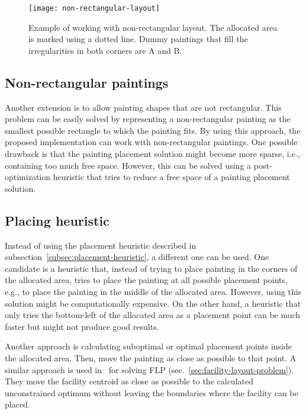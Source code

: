 \begin{figure}[h!]
    \texttt{[image: non-rectangular-layout]}
    \caption[Example of working with non-rectangular layout]{Example of working with non-rectangular layout. The allocated area is marked using a dotted line.
    Dummy paintings that fill the irregularities in both corners are A and B.}
    \label{fig:non-rectangular-layout}
\end{figure}

\subsection{Non-rectangular paintings}\label{subsec:non-rectangular-paintings}

Another extension is to allow painting shapes that are not rectangular.
This problem can be easily solved by representing a non-rectangular painting
as the smallest possible rectangle to which the painting fits.
By using this approach, the proposed implementation can work with non-rectangular paintings.
One possible drawback is that the painting placement solution might become more sparse,
i.e., containing too much free space.
However, this can be solved using a post-optimization heuristic that tries to reduce a free space
of a painting placement solution.

\subsection{Placing heuristic}\label{subsec:placing-heuristic}

Instead of using the placement heuristic described in subsection~\ref{subsec:placement-heuristic}, a different one can be used.
One candidate is a heuristic that, instead of trying to place painting in the corners of the allocated area,
tries to place the painting at all possible placement points, e.g., to place the painting in the middle of the allocated area.
However, using this solution might be computationally expensive.
On the other hand, a heuristic that only tries the bottom-left of the allocated area as a placement point can be much faster but
might not produce good results.

Another approach is calculating suboptimal or optimal placement points inside the allocated area.
Then, move the painting as close as possible to that point.
A similar approach is used in~\cite{goncalvesBiasedRandomkeyGenetic2015} for solving FLP (sec.~\ref{sec:facility-layout-problem}).
They move the facility centroid as close as possible to the calculated unconstrained optimum without leaving the
boundaries where the facility can be placed.

